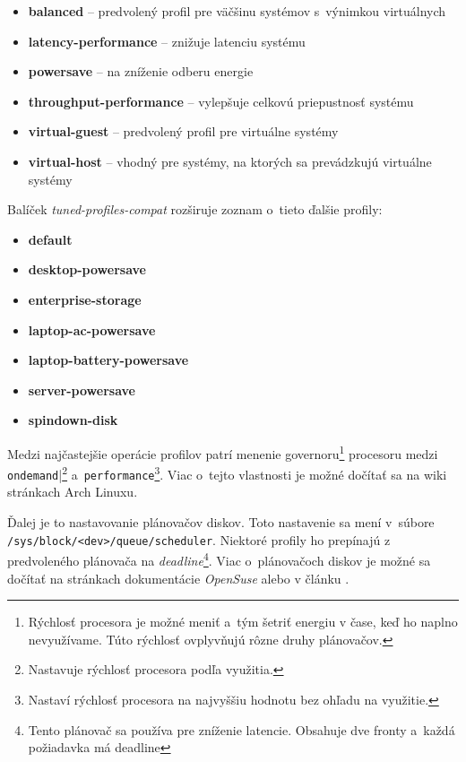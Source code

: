 \begin{itemize}
    \item \textbf{balanced} -- predvolený profil pre väčšinu systémov s~výnimkou virtuálnych
    \item \textbf{latency-performance} -- znižuje latenciu systému
    \item \textbf{powersave} -- na zníženie odberu energie
    \item \textbf{throughput-performance} -- vylepšuje celkovú priepustnosť systému 
    \item \textbf{virtual-guest} -- predvolený profil pre virtuálne systémy
    \item \textbf{virtual-host} -- vhodný pre systémy, na ktorých sa prevádzkujú virtuálne systémy
\end{itemize}

Balíček \emph{tuned-profiles-compat} rozširuje zoznam o~tieto ďalšie profily:

\begin{itemize}
    \item \textbf{default}
    \item \textbf{desktop-powersave}
    \item \textbf{enterprise-storage}
    \item \textbf{laptop-ac-powersave}
    \item \textbf{laptop-battery-powersave}
    \item \textbf{server-powersave}
    \item \textbf{spindown-disk}
\end{itemize}

Medzi najčastejšie operácie profilov patrí menenie governoru\footnote{Rýchlosť
procesora je možné meniť a~tým šetriť energiu v čase, keď ho naplno
nevyužívame. Túto rýchlosť ovplyvňujú rôzne druhy plánovačov.} procesoru medzi
\texttt{ondemand}|\footnote{Nastavuje rýchlosť procesora podľa využitia.}
a~\texttt{performance}\footnote{Nastaví rýchlosť procesora na najvyššiu hodnotu
bez ohľadu na využitie.}. Viac o~tejto vlastnosti je možné dočítať sa na wiki
stránkach Arch Linuxu\cite{arch:governor}.

Ďalej je to nastavovanie plánovačov diskov. Toto nastavenie sa mení v~súbore
\texttt{/sys\-/block\-/<dev>\-/queue\-/scheduler}. Niektoré profily ho prepínajú z
predvoleného plánovača na \emph{deadline}\footnote{Tento plánovač sa používa
pre zníženie latencie. Obsahuje dve fronty a~každá požiadavka má deadline}.
Viac o~plánovačoch diskov je možné sa dočítať na stránkach dokumentácie
\emph{OpenSuse}\cite{suse:scheduler} alebo v článku \cite{book:scheduler}.

